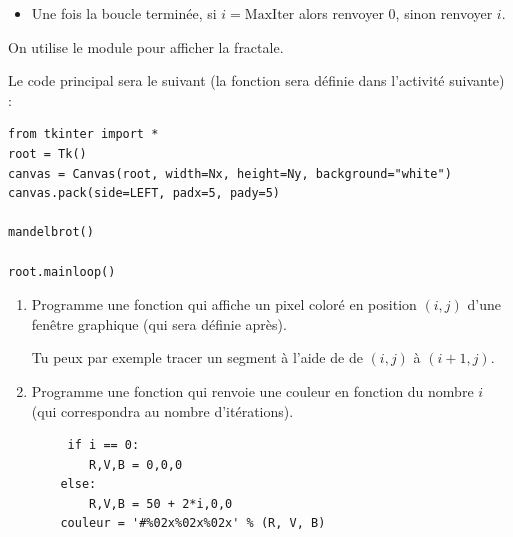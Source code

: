 \documentclass[11pt,class=report,crop=false]{standalone}
\begin{document}
\begin{activite}
\begin{enumerate}
\begin{algorithme}
\begin{itemize}
   \item Une fois la boucle terminée, si $i = \text{MaxIter}$ alors renvoyer $0$, sinon renvoyer $i$.
   
 \end{itemize}  
 \end{algorithme}
  
\end{enumerate} 

\end{activite}






\begin{activite}


On utilise le module  pour afficher la fractale.

Le code principal sera le suivant (la fonction  sera définie dans l'activité suivante) :
\begin{lstlisting}
from tkinter import *
root = Tk()      
canvas = Canvas(root, width=Nx, height=Ny, background="white")
canvas.pack(side=LEFT, padx=5, pady=5)

mandelbrot()

root.mainloop()
\end{lstlisting} 



\begin{enumerate}
  \item  Programme une fonction  qui affiche 
  un pixel coloré en position $(i,j)$ d'une fenêtre graphique (qui sera définie après).
 
 Tu peux par exemple tracer un segment à l'aide de  de
 $(i,j)$ à $(i+1,j)$.
 
   \item  Programme une fonction  qui renvoie une couleur en fonction du nombre $i$ (qui correspondra au nombre d'itérations).

\begin{lstlisting}
     if i == 0:
        R,V,B = 0,0,0
    else: 
        R,V,B = 50 + 2*i,0,0
    couleur = '#%02x%02x%02x' % (R, V, B)    
\end{lstlisting}  


\end{enumerate}
\end{activite}
\end{document}
